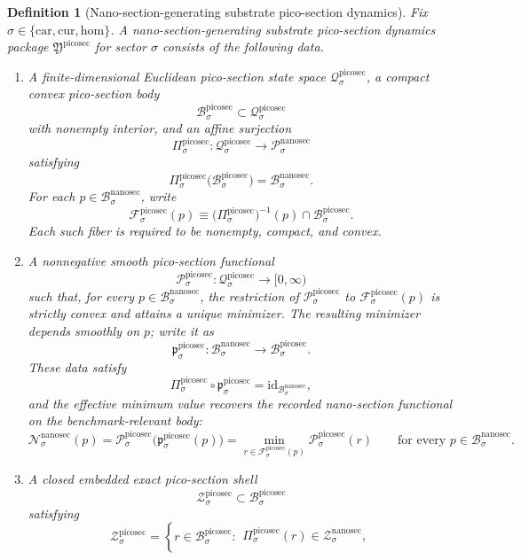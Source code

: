 \documentclass[11pt]{article}
\newcommand{\Car}{\mathrm{car}}
\newcommand{\Cur}{\mathrm{cur}}
\newcommand{\Hom}{\mathrm{hom}}
\newcommand{\NanoSectionSpace}[1]{\mathcal P_{#1}^{\mathrm{nanosec}}}
\newcommand{\NanoSectionBody}[1]{\mathcal B_{#1}^{\mathrm{nanosec}}}
\newcommand{\NanoSectionFunctional}[1]{\mathscr N_{#1}^{\mathrm{nanosec}}}
\newcommand{\NanoSectionShell}[1]{\mathcal Z_{#1}^{\mathrm{nanosec}}}
\newcommand{\PicoSectionPackage}{\mathfrak Y^{\mathrm{picosec}}}
\newcommand{\PicoSectionSpace}[1]{\mathcal Q_{#1}^{\mathrm{picosec}}}
\newcommand{\PicoSectionBody}[1]{\mathcal B_{#1}^{\mathrm{picosec}}}
\newcommand{\PicoSectionProj}[1]{\Pi_{#1}^{\mathrm{picosec}}}
\newcommand{\PicoSectionFiber}[2]{\mathcal F_{#1}^{\mathrm{picosec}}(#2)}
\newcommand{\PicoSectionNanoMin}[1]{\mathfrak p_{#1}^{\mathrm{picosec}}}
\newcommand{\PicoSectionFunctional}[1]{\mathscr P_{#1}^{\mathrm{picosec}}}
\newcommand{\PicoSectionShell}[1]{\mathcal Z_{#1}^{\mathrm{picosec}}}
\newtheorem{definition}{Definition}
\begin{document}
\begin{definition}[Nano-section-generating substrate pico-section dynamics]
\label{def:picosec}
Fix \(\sigma\in\{\Car,\Cur,\Hom\}\). A nano-section-generating substrate pico-section dynamics package \(\PicoSectionPackage\) for sector \(\sigma\) consists of the following data.
\begin{enumerate}
    \item A finite-dimensional Euclidean pico-section state space \(\PicoSectionSpace{\sigma}\), a compact convex pico-section body
    \[
    \PicoSectionBody{\sigma}\subset\PicoSectionSpace{\sigma}
    \]
    with nonempty interior, and an affine surjection
    \[
    \PicoSectionProj{\sigma}:\PicoSectionSpace{\sigma}\to\NanoSectionSpace{\sigma}
    \]
    satisfying
    \[
    \PicoSectionProj{\sigma}\bigl(\PicoSectionBody{\sigma}\bigr)=\NanoSectionBody{\sigma}.
    \]
    For each \(p\in\NanoSectionBody{\sigma}\), write
    \[
    \PicoSectionFiber{\sigma}{p}
    \equiv
    \bigl(\PicoSectionProj{\sigma}\bigr)^{-1}(p)\cap\PicoSectionBody{\sigma}.
    \]
    Each such fiber is required to be nonempty, compact, and convex.
    \item A nonnegative smooth pico-section functional
    \[
    \PicoSectionFunctional{\sigma}:\PicoSectionSpace{\sigma}\to[0,\infty)
    \]
    such that, for every \(p\in\NanoSectionBody{\sigma}\), the restriction of \(\PicoSectionFunctional{\sigma}\) to \(\PicoSectionFiber{\sigma}{p}\) is strictly convex and attains a unique minimizer. The resulting minimizer depends smoothly on \(p\); write it as
    \[
    \PicoSectionNanoMin{\sigma}:\NanoSectionBody{\sigma}\to\PicoSectionBody{\sigma}.
    \]
    These data satisfy
    \[
    \PicoSectionProj{\sigma}\circ\PicoSectionNanoMin{\sigma}
    =
    \mathrm{id}_{\NanoSectionBody{\sigma}},
    \]
    and the effective minimum value recovers the recorded nano-section functional on the benchmark-relevant body:
    \[
    \NanoSectionFunctional{\sigma}(p)
    =
    \PicoSectionFunctional{\sigma}\bigl(\PicoSectionNanoMin{\sigma}(p)\bigr)
    =
    \min_{r\in\PicoSectionFiber{\sigma}{p}}
    \PicoSectionFunctional{\sigma}(r)
    \qquad
    \text{for every }
    p\in\NanoSectionBody{\sigma}.
    \]
    \item A closed embedded exact pico-section shell
    \[
    \PicoSectionShell{\sigma}\subset\PicoSectionBody{\sigma}
    \]
    satisfying
    \[
    \PicoSectionShell{\sigma}
    =
    \left\{
    r\in\PicoSectionBody{\sigma}:
    \begin{array}{l}
    \PicoSectionProj{\sigma}(r)\in\NanoSectionShell{\sigma},\\[0.2em]

\end{array}\]
\end{enumerate}
\end{definition}
\end{document}
